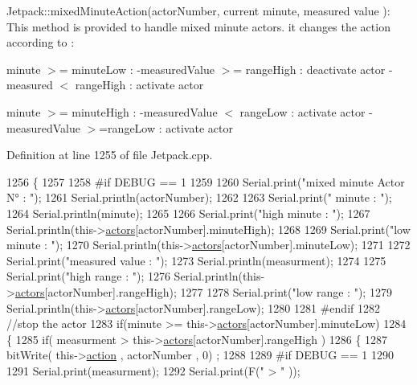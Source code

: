 Jetpack\+::mixed\+Minute\+Action(actor\+Number, current minute, measured value )\+: This method is provided to handle mixed minute actors. it changes the action according to \+:

minute $>$= minute\+Low \+: -\/measured\+Value $>$= range\+High \+: deactivate actor -\/measured $<$ range\+High \+: activate actor

minute $>$= minute\+High \+: -\/measured\+Value $<$ range\+Low \+: activate actor -\/measured\+Value $>$=range\+Low \+: activate actor 

Definition at line 1255 of file Jetpack.\+cpp.


\begin{DoxyCode}
1256 \{
1257 
1258 \textcolor{preprocessor}{#if DEBUG == 1}
1259     
1260     Serial.print(\textcolor{stringliteral}{"mixed minute Actor N° : "});
1261     Serial.println(actorNumber);
1262 
1263     Serial.print(\textcolor{stringliteral}{" minute : "});
1264     Serial.println(minute);
1265 
1266     Serial.print(\textcolor{stringliteral}{"high minute : "});
1267     Serial.println(this->\hyperlink{class_jetpack_a7e16d2f97837f9712a2e6de1c50d99db}{actors}[actorNumber].minuteHigh);
1268 
1269     Serial.print(\textcolor{stringliteral}{"low minute : "});
1270     Serial.println(this->\hyperlink{class_jetpack_a7e16d2f97837f9712a2e6de1c50d99db}{actors}[actorNumber].minuteLow);
1271 
1272     Serial.print(\textcolor{stringliteral}{"measured value : "});
1273     Serial.println(measurment);
1274 
1275     Serial.print(\textcolor{stringliteral}{"high range : "});
1276     Serial.println(this->\hyperlink{class_jetpack_a7e16d2f97837f9712a2e6de1c50d99db}{actors}[actorNumber].rangeHigh);
1277 
1278     Serial.print(\textcolor{stringliteral}{"low range : "});
1279     Serial.println(this->\hyperlink{class_jetpack_a7e16d2f97837f9712a2e6de1c50d99db}{actors}[actorNumber].rangeLow);
1280 
1281 \textcolor{preprocessor}{#endif}
1282     \textcolor{comment}{//stop the actor    }
1283     \textcolor{keywordflow}{if}(minute >= this->\hyperlink{class_jetpack_a7e16d2f97837f9712a2e6de1c50d99db}{actors}[actorNumber].minuteLow)
1284     \{
1285             \textcolor{keywordflow}{if}( measurment > this->\hyperlink{class_jetpack_a7e16d2f97837f9712a2e6de1c50d99db}{actors}[actorNumber].rangeHigh )
1286             \{
1287                 bitWrite( this->\hyperlink{class_jetpack_aca3142925a7b0834b34ae91d26af7765}{action} , actorNumber , 0) ;
1288 
1289 \textcolor{preprocessor}{            #if DEBUG == 1 }
1290 
1291                 Serial.print(measurment);
1292                 Serial.print(F(\textcolor{stringliteral}{" > "} ));

\end{DoxyCode}
